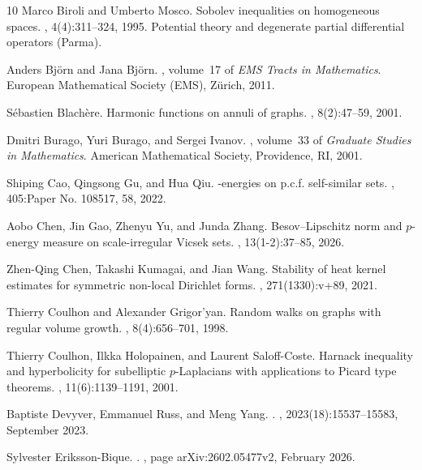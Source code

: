 \documentclass[11pt,a4paper]{article}
\numberwithin{equation}{section}
\theoremstyle{plain}
\theoremstyle{definition}
\begin{document}
\begin{thebibliography}{10}
Marco Biroli and Umberto Mosco.
\newblock Sobolev inequalities on homogeneous spaces.
, 4(4):311--324, 1995.
\newblock Potential theory and degenerate partial differential operators
  (Parma).

Anders Bj\"orn and Jana Bj\"orn.
, volume~17 of {\em
  EMS Tracts in Mathematics}.
\newblock European Mathematical Society (EMS), Z\"urich, 2011.

S\'ebastien Blach\`ere.
\newblock Harmonic functions on annuli of graphs.
, 8(2):47--59, 2001.

Dmitri Burago, Yuri Burago, and Sergei Ivanov.
, volume~33 of {\em Graduate Studies
  in Mathematics}.
\newblock American Mathematical Society, Providence, RI, 2001.

Shiping Cao, Qingsong Gu, and Hua Qiu.
-energies on p.c.f. self-similar sets.
, 405:Paper No. 108517, 58, 2022.

Aobo Chen, Jin Gao, Zhenyu Yu, and Junda Zhang.
\newblock Besov--{L}ipschitz norm and {$p$}-energy measure on scale-irregular
  {V}icsek sets.
, 13(1-2):37--85, 2026.

Zhen-Qing Chen, Takashi Kumagai, and Jian Wang.
\newblock Stability of heat kernel estimates for symmetric non-local
  {D}irichlet forms.
, 271(1330):v+89, 2021.

Thierry Coulhon and Alexander Grigor'yan.
\newblock Random walks on graphs with regular volume growth.
, 8(4):656--701, 1998.

Thierry Coulhon, Ilkka Holopainen, and Laurent Saloff-Coste.
\newblock Harnack inequality and hyperbolicity for subelliptic
  {$p$}-{L}aplacians with applications to {P}icard type theorems.
, 11(6):1139--1191, 2001.

Baptiste Devyver, Emmanuel Russ, and Meng Yang.
.
,
  2023(18):15537--15583, September 2023.

Sylvester {Eriksson-Bique}.
.
, page arXiv:2602.05477v2, February 2026.


\end{thebibliography}
\end{document}
